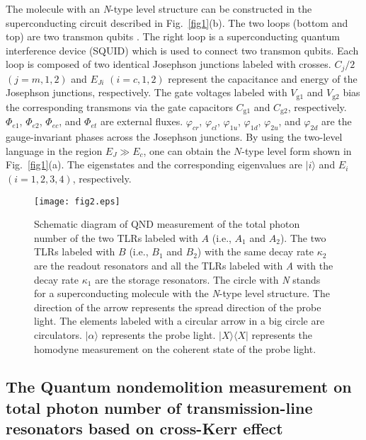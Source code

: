 \documentclass[showpacs,aps,graphicx,twocolumn]{revtex4}
\begin{document}
The  molecule with an \emph{N}-type level structure can be
constructed in the superconducting circuit described in
Fig.~\ref{fig1}(b). The two loops (bottom and top) are two transmon
qubits \cite{JKoch}. The right loop is a superconducting quantum
interference device (SQUID) \cite{JSiewert} which is used to connect
two transmon qubits. Each loop is composed of two identical
Josephson junctions labeled with crosses. $C_{j}/2$ $(j=m,1,2)$ and
$E_{Ji}$ $(i=c,1,2)$ represent the capacitance and energy of the
Josephson junctions, respectively. The gate voltages labeled with
$V_{\text{g}1}$ and $V_{\text{g}2}$ bias the corresponding transmons
via the gate capacitors $C_{\text{g}1}$ and $C_{\text{g}2}$,
respectively. $\Phi_{e1}$, $\Phi_{e2}$, $\Phi_{ec}$, and $\Phi_{et}$
are external fluxes. $\varphi_{cr}$, $\varphi_{cl}$, $\varphi_{1u}$,
$\varphi_{1d}$, $\varphi_{2u}$, and $\varphi_{2d}$ are the
gauge-invariant phases across the Josephson junctions. By using the
two-level language in the region $E_{J}\gg E_{c}$, one can obtain
the $N$-type level form \cite{YHu,JKoch} shown in
Fig.~\ref{fig1}(a). The eigenstates and the corresponding
eigenvalues are $|i\rangle$ and $E_{i}$ $(i=1,2,3,4)$, respectively.




\begin{figure}[!ht]%
\begin{center}
\texttt{[image: fig2.eps]}
\caption{ Schematic diagram of QND measurement of the total
photon number of the two TLRs labeled with $A$ (i.e., $A_1$ and
$A_2$). The two TLRs labeled with $B$  (i.e., $B_1$ and $B_2$) with
the same decay rate $\kappa_{2}$ are the readout resonators and all
the TLRs labeled with \emph{A} with the decay rate $\kappa_{1}$ are
the storage resonators. The circle with \emph{N} stands for a
superconducting molecule with the \emph{N}-type level structure. The
direction of the arrow represents the spread direction of the probe
light. The elements labeled with a circular arrow in a big circle
are circulators. $|\alpha\rangle$ represents the probe light.
$|X\rangle\langle X|$ represents the homodyne measurement on the
coherent state of the probe light. } \label{fig2}
\end{center}
\end{figure}






\subsection{The Quantum nondemolition measurement on total photon number of transmission-line resonators based on cross-Kerr effect}
\label{sec22}
\end{document}
